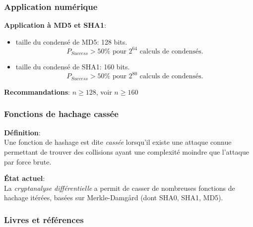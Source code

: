 \begin{frame}
  \frametitle{Application numérique}
  \vfill

\textbf{Application à MD5 et SHA1}:
\begin{itemize}
\item taille du condensé de MD5: 128 bits.
$$P_{Success} > 50\% \mbox{ pour } 2^{64} \mbox{ calculs de condensés.}$$
\item taille du condensé de SHA1: 160 bits.
$$P_{Success} > 50\% \mbox{ pour } 2^{80} \mbox{ calculs de condensés.}$$
\end{itemize}
  \vspace{0.3cm}
\textbf{Recommandations}: $n \ge 128$, voir $n\ge 160$
  \vfill
\end{frame}

\begin{frame}
  \frametitle{Fonctions de hachage cassée}
  \vfill
\textbf{Définition}:\\
Une fonction de hashage est dite \emph{cassée} lorsqu'il existe une attaque connue permettant de trouver des collisions ayant une complexité moindre que l'attaque par force brute.
  \vspace{1.5cm}
  
\textbf{État actuel}:\\
La \emph{cryptanalyse différentielle} a permit de casser de nombreuses fonctions de hachage itérées, basées sur Merkle-Damg\r{a}rd (dont SHA0, SHA1, MD5).
  \vfill
\end{frame}





\nocite{*}


\begin{frame}[allowframebreaks]
  \frametitle{Livres et références}
  
\end{frame}

\begin{frame}
  \vfill
  \centering
  \vfill
\end{frame}
